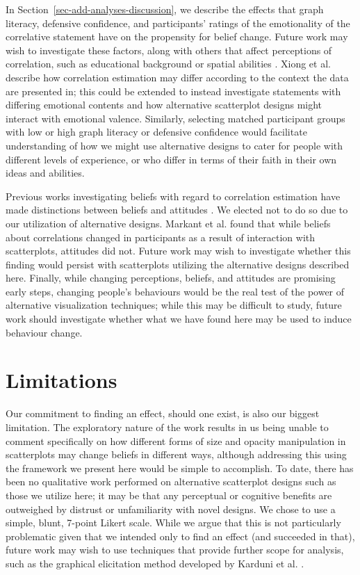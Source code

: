\documentclass[manuscript,screen,review,anonymous]{acmart}
\begin{document}
In Section~\ref{sec-add-analyses-discussion}, we describe the effects
that graph literacy, defensive confidence, and participants' ratings of
the emotionality of the correlative statement have on the propensity for
belief change. Future work may wish to investigate these factors, along
with others that affect perceptions of correlation, such as educational
background or spatial abilities \citep{tandon_2024}. Xiong et al.
\citep{xiong_2022} describe how correlation estimation may differ
according to the context the data are presented in; this could be
extended to instead investigate statements with differing emotional
contents and how alternative scatterplot designs might interact with
emotional valence. Similarly, selecting matched participant groups with
low or high graph literacy or defensive confidence would facilitate
understanding of how we might use alternative designs to cater for
people with different levels of experience, or who differ in terms of
their faith in their own ideas and abilities.

Previous works investigating beliefs with regard to correlation
estimation have made distinctions between beliefs and attitudes
\citep{xiong_2022, markant_2023}. We elected not to do so due to our
utilization of alternative designs. Markant et al. \citep{markant_2023}
found that while beliefs about correlations changed in participants as a
result of interaction with scatterplots, attitudes did not. Future work
may wish to investigate whether this finding would persist with
scatterplots utilizing the alternative designs described here. Finally,
while changing perceptions, beliefs, and attitudes are promising early
steps, changing people's behaviours would be the real test of the power
of alternative visualization techniques; while this may be difficult to
study, future work should investigate whether what we have found here
may be used to induce behaviour change.

\section{Limitations}\label{sec-limitations}

Our commitment to finding an effect, should one exist, is also our
biggest limitation. The exploratory nature of the work results in us
being unable to comment specifically on how different forms of size and
opacity manipulation in scatterplots may change beliefs in different
ways, although addressing this using the framework we present here would
be simple to accomplish. To date, there has been no qualitative work
performed on alternative scatterplot designs such as those we utilize
here; it may be that any perceptual or cognitive benefits are outweighed
by distrust or unfamiliarity with novel designs. We chose to use a
simple, blunt, 7-point Likert scale. While we argue that this is not
particularly problematic given that we intended only to find an effect
(and succeeded in that), future work may wish to use techniques that
provide further scope for analysis, such as the graphical elicitation
method developed by Karduni et al. \citep{karduni_2021, karduni_2023}.
\end{document}
